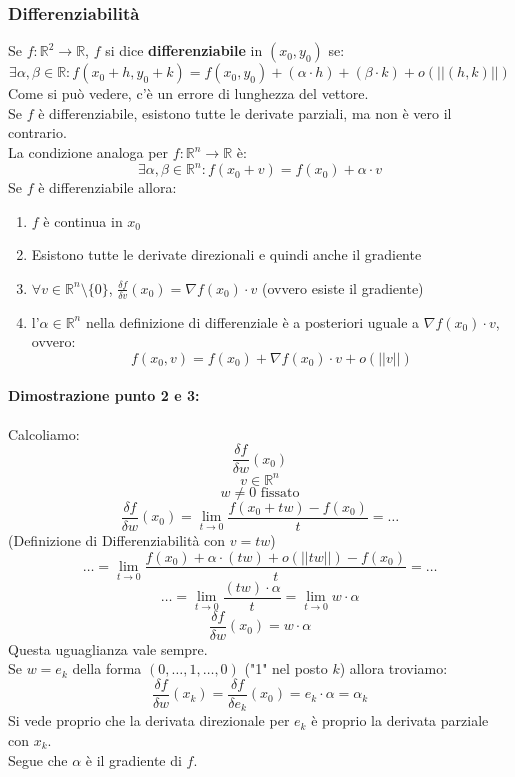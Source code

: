 \documentclass[12pt,a4paper]{article}
\begin{document}
\subsubsection{Differenziabilità}
Se $f: \mathbb{R}^2 \to \mathbb{R}$, $f$ si dice \textbf{differenziabile} in $(x_0,y_0)$ se:
\[
\exists \alpha,\beta \in \mathbb{R} : f(x_0 + h, y_0 + k) = f(x_0,y_0) + (\alpha \cdot h) + (\beta \cdot k) + o(||(h,k)||)
\]
Come si può vedere, c'è un errore di lunghezza del vettore.\\
Se $f$ è differenziabile, esistono tutte le derivate parziali, ma non è vero il contrario.\\
La condizione analoga per $f:\mathbb{R}^n \to \mathbb{R}$ è:
\[
\exists \alpha,\beta \in \mathbb{R}^n : f(x_0 + v) = f(x_0) + \alpha \cdot v
\]
Se $f$ è differenziabile allora:
\begin{enumerate}
  \item $f$ è continua in $x_0$
  \item Esistono tutte le derivate direzionali e quindi anche il gradiente
  \item $\forall v \in \mathbb{R}^n \setminus \{0\}$, $\frac{\delta f}{\delta v}(x_0) = \nabla f(x_0) \cdot v$ (ovvero esiste il gradiente)
  \item l'$\alpha \in \mathbb{R}^n$ nella definizione di differenziale è a posteriori uguale a $\nabla f(x_0) \cdot v$, ovvero:
  \[
  f(x_0,v) = f(x_0) + \nabla f(x_0) \cdot v + o(||v||)
  \]
\end{enumerate}
\paragraph{Dimostrazione punto 2 e 3:}
Calcoliamo:
\[
\frac{\delta f}{\delta w}(x_0)
\]
\[
v \in \mathbb{R}^n
\]
\[
w \ne 0 \text{ fissato}
\]
\[
\frac{\delta f}{\delta w}(x_0) = \lim_{t \to 0} \frac{f(x_0 + tw) - f(x_0)}{t} = \ldots
\]
(Definizione di Differenziabilità con $v = tw$)
\[
\ldots = \lim_{t \to 0} \frac{f(x_0) + \alpha \cdot (tw) + o(||tw||) - f(x_0)}{t}  = \ldots
\]
\[
\ldots = \lim_{t \to 0} \frac{(tw) \cdot \alpha}{t} = \lim_{t \to 0} w \cdot \alpha
\]
\[
\frac{\delta f}{\delta w}(x_0) = w \cdot \alpha
\]
Questa uguaglianza vale sempre.\\
Se $w = e_k$ della forma $(0, \ldots, 1, \ldots, 0)$ ("1" nel posto $k$) allora troviamo:
\[
\frac{\delta f}{\delta w}(x_k) = \frac{\delta f}{\delta e_k}(x_0) = e_k \cdot \alpha = \alpha_k
\]
Si vede proprio che la derivata direzionale per $e_k$ è proprio la derivata parziale con $x_k$.\\
Segue che $\alpha$ è il gradiente di $f$.\\
\end{document}
